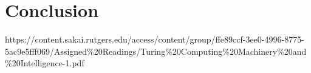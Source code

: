 \documentclass[12]{article}
\begin{document}
	

\section{Conclusion}

\newpage

\begin{thebibliography}{6}

https://content.sakai.rutgers.edu/access/content/group/ffe89ccf-3ee0-4996-8775-5ac9e5fff069/Assigned\%20Readings/Turing\%20Computing\%20Machinery\%20and\%20Intelligence-1.pdf

\end{thebibliography}
\end{document}
